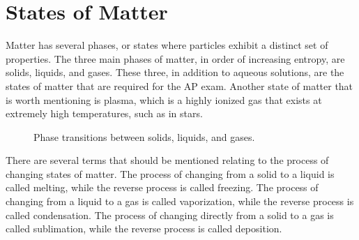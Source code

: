 \section{States of Matter}
Matter has several phases, or states where particles exhibit a distinct set of properties. The three main phases of matter, in order of increasing entropy, are solids, liquids, and gases. These three, in addition to aqueous solutions, are the states of matter that are required for the AP exam. Another state of matter that is worth mentioning is plasma, which is a highly ionized gas that exists at extremely high temperatures, such as in stars. 
\begin{figure}[ht]
    \centering
    \caption{Phase transitions between solids, liquids, and gases.}
    \label{fig:phase_transitions}
\end{figure}
There are several terms that should be mentioned relating to the process of changing states of matter. The process of changing from a solid to a liquid is called melting, while the reverse process is called freezing. The process of changing from a liquid to a gas is called vaporization, while the reverse process is called condensation. The process of changing directly from a solid to a gas is called sublimation, while the reverse process is called deposition.
